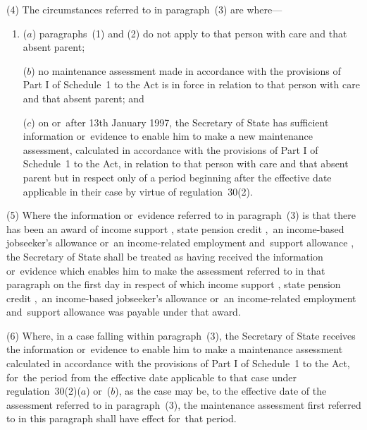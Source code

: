 \documentclass[a4paper,12pt]{article}
\begin{document}
(4) The circumstances referred to in paragraph~(3) are where—
\begin{enumerate}\item[]
($a$) paragraphs~(1) and (2) do not apply to that person with care and that absent parent;

($b$) no maintenance assessment made in accordance with the provisions of Part I of Schedule~1 to the Act is in force in relation to that person with care and that absent parent; and

($c$) on or~after 13th January 1997, 
the Secretary of State  %
has sufficient information or~evidence to enable him to make a new maintenance assessment, calculated in accordance with the provisions of Part I of Schedule~1 to the Act, in relation to that person with care and that absent parent but in respect only of a period beginning after the effective date applicable in their case by virtue of regulation~30(2).
\end{enumerate}

(5) Where the information or~evidence referred to in paragraph~(3) is that there has been an award of income support%
, state pension credit%
,~an income-based jobseeker’s allowance or~an income-related employment and~support allowance%
, the Secretary of State shall be treated as having received the information or~evidence which enables 
him  %
to make the assessment referred to in that paragraph on the first day in respect of which income support%
, state pension credit%
,~an income-based jobseeker’s allowance or~an income-related employment and~support allowance  %
was payable under that award.

(6) Where, in a case falling within paragraph~(3), 
the Secretary of State  %
receives the information or~evidence to enable him to make a maintenance assessment calculated in accordance with the provisions of Part I of Schedule~1 to the Act, for~the period from the effective date applicable to that case under regulation~30(2)($a$) or~($b$), as the case may be, to the effective date of the assessment referred to in paragraph~(3), the maintenance assessment first referred to in this paragraph shall have effect for~that period.
\end{document}
